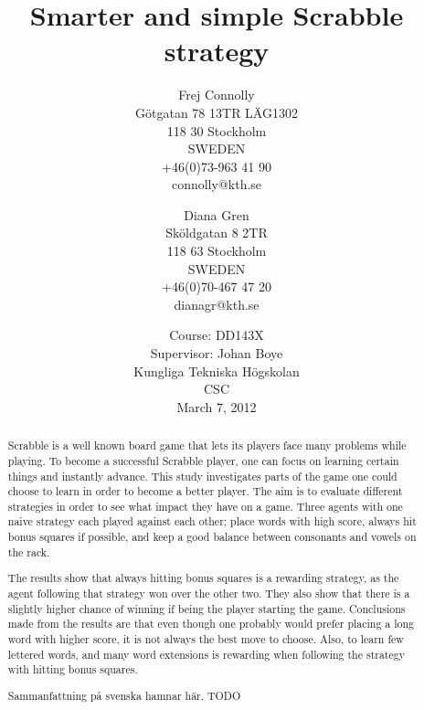 \documentclass[a4paper, 12pt]{report}
\begin{document}
\graphicspath{{./images/}}
\title{Smarter and simple Scrabble strategy}
\date{Course: DD143X \\ Supervisor: Johan Boye \\ Kungliga Tekniska Högskolan \\ CSC \\ March 7, 2012}
\author{Frej Connolly \\ Götgatan 78 13TR LÄG1302 \\ 118 30 Stockholm \\ SWEDEN \\ +46(0)73-963 41 90 \\ connolly@kth.se \\
        \and Diana Gren \\ Sköldgatan 8 2TR \\ 118 63 Stockholm \\ SWEDEN \\ +46(0)70-467 47 20 \\ dianagr@kth.se}

\maketitle
\begin{abstract}
Scrabble is a well known board game that lets its players face many problems while playing. To become a successful Scrabble player, one can focus on learning certain things and instantly advance. This study investigates parts of the game one could choose to learn in order to become a better player. The aim is to evaluate different strategies in order to see what impact they have on a game. Three agents with one naive strategy each played against each other; place words with high score, always hit bonus squares if possible, and keep a good balance between consonants and vowels on the rack. 

The results show that always hitting bonus squares is a rewarding strategy, as the agent following that strategy won over the other two. They also show that there is a slightly higher chance of winning if being the player starting the game. Conclusions made from the results are that even though one probably would prefer placing a long word with higher score, it is not always the best move to choose. Also, to learn few lettered words, and many word extensions is rewarding when following the strategy with hitting bonus squares.
\end{abstract}

\begin{abstract}
Sammanfattning på svenska hamnar här. TODO
\end{abstract}
\tableofcontents
\end{document}
